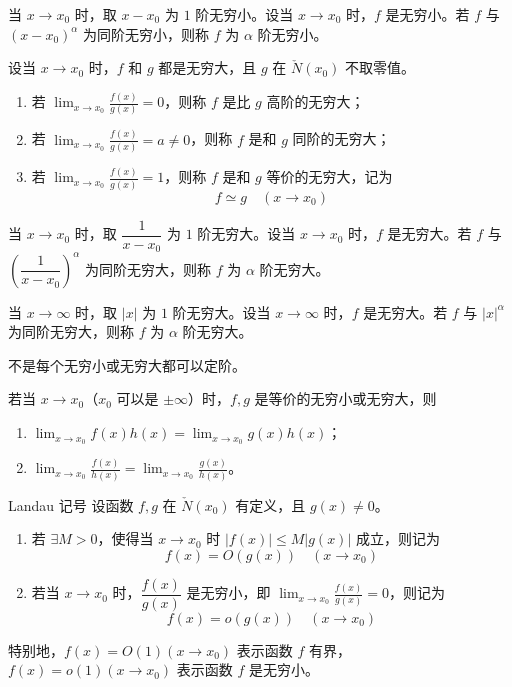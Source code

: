 当 $x \to x_0$ 时，取 $x - x_0$ 为 $1$ 阶无穷小。设当 $x \to x_0$ 时，$f$ 是无穷小。若 $f$ 与 $(x - x_0)^{\alpha}$ 为同阶无穷小，则称 $f$ 为 $\alpha$ 阶无穷小。

\begin{definition}
    设当 $x \to x_0$ 时，$f$ 和 $g$ 都是无穷大，且 $g$ 在 $\check{N}(x_0)$ 不取零值。
    \begin{enumerate}[itemsep=0.5em, topsep=0.5em]
        \item 若 $\displaystyle \lim_{x \to x_0}\frac{f(x)}{g(x)} = 0$，则称 $f$ 是比 $g$ 高阶的无穷大；
        \item 若 $\displaystyle \lim_{x \to x_0}\frac{f(x)}{g(x)} = a \neq 0$，则称 $f$ 是和 $g$ 同阶的无穷大；
        \item 若 $\displaystyle \lim_{x \to x_0}\frac{f(x)}{g(x)} = 1$，则称 $f$ 是和 $g$ 等价的无穷大，记为
              \[f \simeq g\quad (x \to x_0)\]
    \end{enumerate}
\end{definition}

当 $x \to x_0$ 时，取 $\dfrac{1}{x - x_0}$ 为 $1$ 阶无穷大。设当 $x \to x_0$ 时，$f$ 是无穷大。若 $f$ 与 $\left(\dfrac{1}{x - x_0}\right)^{\alpha}$ 为同阶无穷大，则称 $f$ 为 $\alpha$ 阶无穷大。

当 $x \to \infty$ 时，取 $|x|$ 为 $1$ 阶无穷大。设当 $x \to \infty$ 时，$f$ 是无穷大。若 $f$ 与 $|x|^{\alpha}$ 为同阶无穷大，则称 $f$ 为 $\alpha$ 阶无穷大。

\begin{remark}
    不是每个无穷小或无穷大都可以定阶。
\end{remark}

\begin{theorem}
    若当 $x \to x_0$（$x_0$ 可以是 $\pm \infty$）时，$f, g$ 是等价的无穷小或无穷大，则
    \begin{enumerate}
        \item $\displaystyle \lim_{x \to x_0}f(x)h(x) = \lim_{x \to x_0}g(x)h(x)$；
        \item $\displaystyle \lim_{x \to x_0}\frac{f(x)}{h(x)} = \lim_{x \to x_0}\frac{g(x)}{h(x)}$。
    \end{enumerate}
\end{theorem}

\begin{definition}{Landau 记号}
    设函数 $f, g$ 在 $\check{N}(x_0)$ 有定义，且 $g(x) \neq 0$。
    \begin{enumerate}
        \item 若 $\exists M > 0$，使得当 $x \to x_0$ 时 $|f(x)| \leqslant M|g(x)|$ 成立，则记为
              \[f(x) = O(g(x))\quad (x \to x_0)\]
        \item 若当 $x \to x_0$ 时，$\dfrac{f(x)}{g(x)}$ 是无穷小，即 $\displaystyle \lim_{x \to x_0}\frac{f(x)}{g(x)} = 0$，则记为
              \[f(x) = o(g(x))\quad (x \to x_0)\]
    \end{enumerate}
    特别地，$f(x) = O(1)(x \to x_0)$ 表示函数 $f$ 有界， $f(x) = o(1)(x \to x_0)$ 表示函数 $f$ 是无穷小。
\end{definition}

